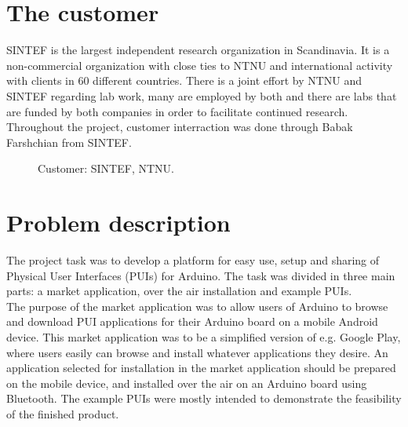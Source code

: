 \section{The customer}
\label{sec:sintef}
\label{sec:ntnu}
SINTEF is the largest independent research organization in Scandinavia. It is a non-commercial organization with close ties to NTNU and international activity with clients in 60 different countries. There is a joint effort by NTNU and SINTEF regarding lab work, many are employed by both and there are labs that are funded by both companies in order to facilitate continued research. \\
\newline
Throughout the project, customer interraction was done through Babak Farshchian from SINTEF.\\
\begin{figure}[H]
%
\hfill
{}%
\caption{Customer: \protect{\ref{fig:sintef}} SINTEF, \protect{\ref{fig:ntnu}} NTNU.}
\end{figure}

\section{Problem description}
The project task was to develop a platform for easy use, setup and sharing of Physical User Interfaces (PUIs) for Arduino. The task was divided in three main parts: a market application, over the air installation and example PUIs.\\
\newline
The purpose of the market application was to allow users of Arduino to browse and download PUI applications for their Arduino board on a mobile Android device. This market application was to be a simplified version of e.g. Google Play, where users easily can browse and install whatever applications they desire. An application selected for installation in the market application should be prepared on the mobile device, and installed over the air on an Arduino board using Bluetooth. The example PUIs were mostly intended to demonstrate the feasibility of the finished product.

